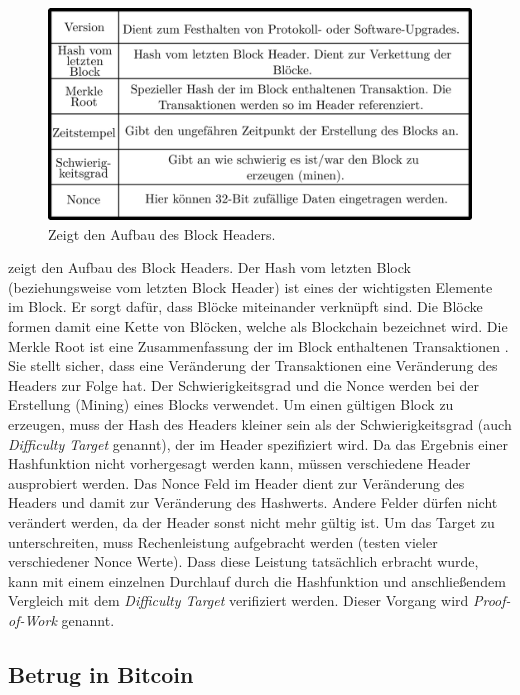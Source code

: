 \documentclass[ngerman,runningheads,a4paper]{llncs}[2018/03/10]
\begin{document}
\begin{figure}
  \centering
  \includegraphics[width=.8\textwidth]{grafiken/tableBlock.png}
  \caption{Zeigt den Aufbau des Block Headers.}
  \label{fig:blockTable}
\end{figure}

 zeigt den Aufbau des Block Headers. Der Hash vom letzten Block (beziehungsweise vom letzten Block Header) ist eines der wichtigsten Elemente im Block. Er sorgt dafür, dass Blöcke miteinander verknüpft sind. Die Blöcke formen damit eine Kette von Blöcken, welche als Blockchain bezeichnet wird. Die Merkle Root ist eine Zusammenfassung der im Block enthaltenen Transaktionen \citep{bitcoinbook}. Sie stellt sicher, dass eine Veränderung der Transaktionen eine Veränderung des Headers zur Folge hat. Der Schwierigkeitsgrad und die Nonce werden bei der Erstellung (Mining) eines Blocks verwendet. Um einen gültigen Block zu erzeugen, muss der Hash des Headers kleiner sein als der Schwierigkeitsgrad (auch \textit{Difficulty Target} genannt), der im Header spezifiziert wird. Da das Ergebnis einer Hashfunktion nicht vorhergesagt werden kann, müssen verschiedene Header ausprobiert werden. Das Nonce Feld im Header dient zur Veränderung des Headers und damit zur Veränderung des Hashwerts. Andere Felder dürfen nicht verändert werden, da der Header sonst nicht mehr gültig ist. Um das Target zu unterschreiten, muss Rechenleistung aufgebracht werden (testen vieler verschiedener Nonce Werte). Dass diese Leistung tatsächlich erbracht wurde, kann mit einem einzelnen Durchlauf durch die Hashfunktion und anschließendem Vergleich mit dem \textit{Difficulty Target} verifiziert werden. Dieser Vorgang wird \textit{Proof-of-Work} genannt.

\subsection{Betrug in Bitcoin}\label{sec:betrug}
\end{document}
